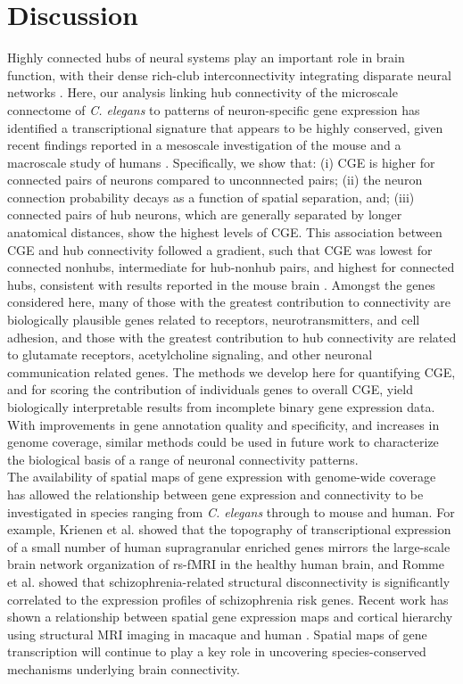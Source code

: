 \documentclass[10pt,letterpaper]{article}
\begin{document}
{\section*{Discussion}
Highly connected hubs of neural systems play an important role in brain function, with their dense rich-club interconnectivity integrating disparate neural networks \cite{vandenHeuvel:2013ge, Fornito2015, deReus:2013cy, vandenHeuvel:2013ij}.
Here, our analysis linking hub connectivity of the microscale connectome of \emph{C. elegans} to patterns of neuron-specific gene expression has identified a transcriptional signature that appears to be highly conserved, given recent findings reported in a mesoscale investigation of the mouse \cite{Fulcher:2016ck} and a macroscale study of humans \cite{Vertes2016a}.
Specifically, we show that:
(i) CGE is higher for connected pairs of neurons compared to unconnnected pairs;
(ii) the neuron connection probability decays as a function of spatial separation, and;
(iii) connected pairs of hub neurons, which are generally separated by longer anatomical distances, show the highest levels of CGE.
This association between CGE and hub connectivity followed a gradient, such that CGE was lowest for connected nonhubs, intermediate for hub-nonhub pairs, and highest for connected hubs, consistent with results reported in the mouse brain \cite{Fulcher:2016ck}.
Amongst the genes considered here, many of those with the greatest contribution to connectivity are biologically plausible genes related to receptors, neurotransmitters, and cell adhesion, and those with the greatest contribution to hub connectivity are related to glutamate receptors, acetylcholine signaling, and other neuronal communication related genes.
The methods we develop here for quantifying CGE, and for scoring the contribution of individuals genes to overall CGE, yield biologically interpretable results from incomplete binary gene expression data.
With improvements in gene annotation quality and specificity, and increases in genome coverage, similar methods could be used in future work to characterize the biological basis of a range of neuronal connectivity patterns.\\

The availability of spatial maps of gene expression with genome-wide coverage has allowed the relationship between gene expression and connectivity to be investigated in species ranging from \textit{C. elegans} through to mouse and human.
For example, Krienen et al. \cite{Krienen:2016eq} showed that the topography of transcriptional expression of a small number of human supragranular enriched genes mirrors the large-scale brain network organization of rs-fMRI in the healthy human brain, and Romme et al. \cite{Romme2016} showed that schizophrenia-related structural disconnectivity is significantly correlated to the expression profiles of schizophrenia risk genes.
Recent work has shown a relationship between spatial gene expression maps and cortical hierarchy using structural MRI imaging in macaque and human \cite{Burt2017}.
Spatial maps of gene transcription will continue to play a key role in uncovering species-conserved mechanisms underlying brain connectivity.

}
\end{document}
